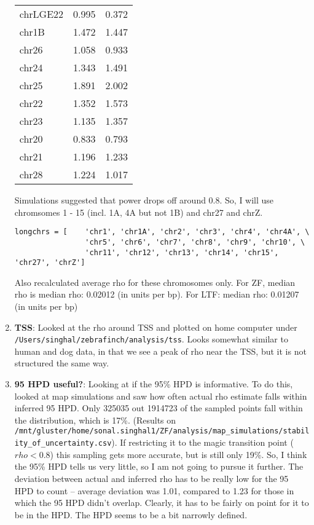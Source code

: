 \documentclass[idxtotoc,hyperref,openany,oneside]{labbook} %
\begin{document}
\begin{enumerate}
\begin{table}[H]
\begin{tabular}{lll}
chrLGE22 & 0.995 & 0.372  \\
chr1B    & 1.472 & 1.447  \\
chr26    & 1.058 & 0.933  \\
chr24    & 1.343 & 1.491  \\
chr25    & 1.891 & 2.002  \\
chr22    & 1.352 & 1.573  \\
chr23    & 1.135 & 1.357  \\
chr20    & 0.833 & 0.793  \\
chr21    & 1.196 & 1.233  \\
chr28    & 1.224 & 1.017  \\
\hline
\end{tabular}
\end{table}
Simulations suggested that power drops off around 0.8. So, I will use chromsomes 1 - 15 (incl. 1A, 4A but not 1B) and chr27 and chrZ. \\
\begin{verbatim}
longchrs = [ 	'chr1', 'chr1A', 'chr2', 'chr3', 'chr4', 'chr4A', \
				'chr5', 'chr6', 'chr7', 'chr8', 'chr9', 'chr10', \
				'chr11', 'chr12', 'chr13', 'chr14', 'chr15', 'chr27', 'chrZ']
\end{verbatim}
Also recalculated average rho for these chromosomes only. For ZF, median rho is median rho: 0.02012 (in units per bp). For LTF: median rho: 0.01207 (in units per bp)
\item \textbf{TSS}: Looked at the rho around TSS and plotted on home computer under \verb+/Users/singhal/zebrafinch/analysis/tss+. Looks somewhat similar to human and dog data, in that we see a peak of rho near the TSS, but it is not structured the same way.
\item \textbf{95 HPD useful?}: Looking at if the 95\% HPD is informative. To do this, looked at map simulations and saw how often actual rho estimate falls within inferred 95 HPD. Only 325035 out 1914723 of the sampled points fall within the distribution, which is 17\%. (Results on \verb+/mnt/gluster/home/sonal.singhal1/ZF/analysis/map_simulations/stability_of_uncertainty.csv+).  If restricting it to the magic transition point ($rho < 0.8$) this sampling gets more accurate, but is still only 19\%. So, I think the 95\% HPD tells us very little, so I am not going to pursue it further. The deviation between actual and inferred rho has to be really low for the 95 HPD to count -- average deviation was 1.01, compared to 1.23 for those in which the 95 HPD didn't overlap. Clearly, it has to be fairly on point for it to be in the HPD. The HPD seems to be a bit narrowly defined.

\end{enumerate}
\end{document}
